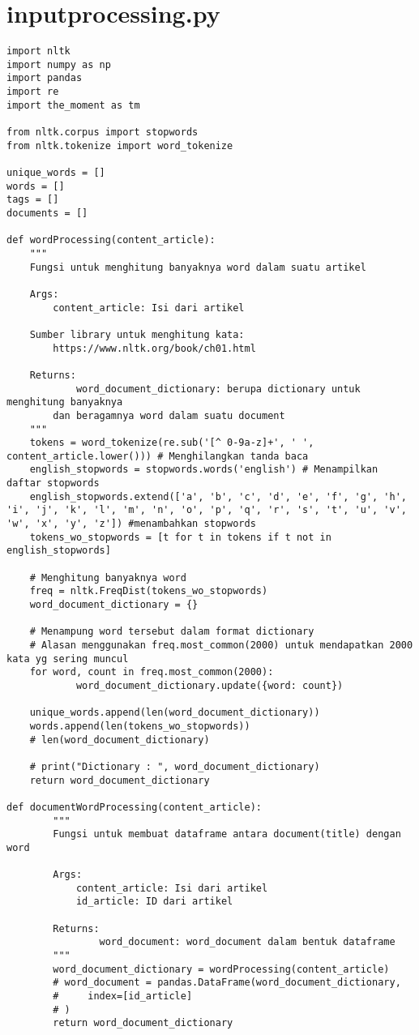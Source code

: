 \chapter{input\textunderscore processing.py}
\begin{lstlisting}[breaklines=true]
import nltk
import numpy as np
import pandas
import re
import the_moment as tm

from nltk.corpus import stopwords
from nltk.tokenize import word_tokenize

unique_words = []
words = []
tags = []
documents = []

def wordProcessing(content_article):
	"""
	Fungsi untuk menghitung banyaknya word dalam suatu artikel

	Args:
		content_article: Isi dari artikel
	
	Sumber library untuk menghitung kata:
		https://www.nltk.org/book/ch01.html
		
	Returns:
			word_document_dictionary: berupa dictionary untuk menghitung banyaknya 
		dan beragamnya word dalam suatu document
	"""
	tokens = word_tokenize(re.sub('[^ 0-9a-z]+', ' ', content_article.lower())) # Menghilangkan tanda baca   
	english_stopwords = stopwords.words('english') # Menampilkan daftar stopwords
	english_stopwords.extend(['a', 'b', 'c', 'd', 'e', 'f', 'g', 'h', 'i', 'j', 'k', 'l', 'm', 'n', 'o', 'p', 'q', 'r', 's', 't', 'u', 'v', 'w', 'x', 'y', 'z']) #menambahkan stopwords
	tokens_wo_stopwords = [t for t in tokens if t not in english_stopwords] 

	# Menghitung banyaknya word
	freq = nltk.FreqDist(tokens_wo_stopwords)
	word_document_dictionary = {}

	# Menampung word tersebut dalam format dictionary
	# Alasan menggunakan freq.most_common(2000) untuk mendapatkan 2000 kata yg sering muncul
	for word, count in freq.most_common(2000):
			word_document_dictionary.update({word: count})
	
	unique_words.append(len(word_document_dictionary))
	words.append(len(tokens_wo_stopwords))
	# len(word_document_dictionary)
			
	# print("Dictionary : ", word_document_dictionary)
	return word_document_dictionary

def documentWordProcessing(content_article):
		"""
		Fungsi untuk membuat dataframe antara document(title) dengan word

		Args:
			content_article: Isi dari artikel
			id_article: ID dari artikel

		Returns:
				word_document: word_document dalam bentuk dataframe
		"""
		word_document_dictionary = wordProcessing(content_article)
		# word_document = pandas.DataFrame(word_document_dictionary,
		#     index=[id_article]
		# )
		return word_document_dictionary


\end{lstlisting}
